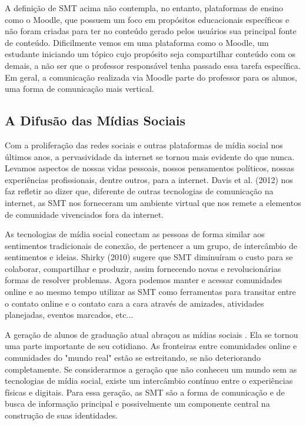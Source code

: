 A definição de SMT acima não contempla, no entanto, plataformas de ensino como o
Moodle, que possuem um foco em propósitos educacionais específicos e não foram
criadas para ter no conteúdo gerado pelos usuários sua principal fonte de
conteúdo. Dificilmente vemos em uma plataforma como o Moodle, um estudante
iniciando um tópico cujo propósito seja compartilhar conteúdo com os demais, a
não ser que o professor responsável tenha passado essa tarefa específica. Em
geral, a comunicação realizada via Moodle parte do professor para os alunos, uma
forma de comunicação mais vertical.

\subsection{A Difusão das Mídias Sociais}

Com a proliferação das redes sociais e outras plataformas de mídia social nos
últimos anos, a pervasividade da internet se tornou mais evidente do que nunca.
Levamos aspectos de nossas vidas pessoais, nossos pensamentos políticos, nossas
experiências profissionais, dentre outros, para a internet. Davis et al. (2012)
nos faz refletir ao dizer que, diferente de outras tecnologias
de comunicação na internet, as SMT nos forneceram um ambiente virtual que nos
remete a elementos de comunidade vivenciados fora da internet.

As tecnologias de mídia social conectam as pessoas de forma similar aos sentimentos
tradicionais de conexão, de pertencer a um grupo, de intercâmbio de sentimentos
e ideias. Shirky (2010)
 sugere que SMT diminuíram o custo para
se colaborar, compartilhar e produzir, assim fornecendo novas e revolucionárias
formas de resolver problemas. Agora podemos manter e acessar comunidades online
e ao mesmo tempo utilizar as SMT como ferramentas para transitar entre o contato
online e o contato cara a cara através de amizades, atividades planejadas,
eventos marcados, etc...

A geração de alunos de graduação atual abraçou as mídias sociais . Ela se tornou
uma parte importante de seu cotidiano. As fronteiras entre comunidades
online e comunidades do "mundo real" estão se estreitando, se não deteriorando
completamente. Se considerarmos a geração que não conheceu um mundo sem as
tecnologias de mídia social, existe um intercâmbio contínuo entre o experiências
físicas e digitais. Para essa geração, as SMT são a forma de comunicação e de
busca de informação principal e possivelmente um componente central na construção
de suas identidades.

